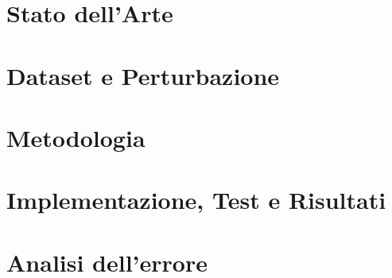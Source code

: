\documentclass[a4paper,12pt]{report}
\begin{document}
\chapter{Stato dell'Arte}
\label{sec:arte}

\chapter{Dataset e Perturbazione}
\label{sec:dataset}

\chapter{Metodologia}
\label{sec:metodologia}


\chapter{Implementazione, Test e Risultati}
\label{sec:test}

\chapter{Analisi dell'errore}
\label{sec:analisi}








\end{document}
